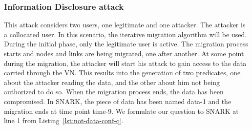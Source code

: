 \subsubsection{Information Disclosure attack}
This attack considers two users, one legitimate and one attacker.
The attacker is a collocated user.
In this scenario, the iterative migration algorithm will be used.
During the initial phase, only the legitimate user is active.
The migration process starts and nodes and links are being migrated, one after another.
At some point during the migration, the attacker will start his attack to gain access to the data carried through the VN.
This results into the generation of two predicates, one about the attacker reading the data, and the other about him not being authorized to do so. 
When the migration process ends, the data has been compromised.
In SNARK, the piece of data has been named data-1 and the migration ends at time point time-9.
We formulate our question to SNARK at line 1 from Listing~\ref{lst:not-data-conf-q}.

